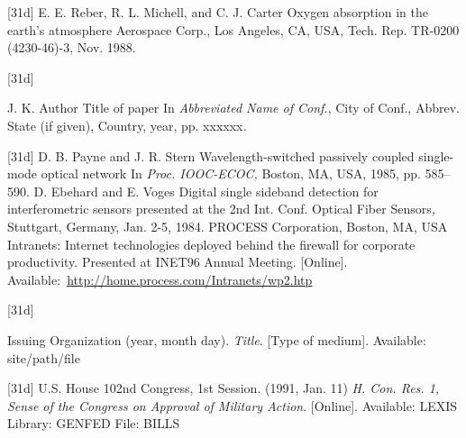 \documentclass{IEEEtaes}
\begin{document}
\vspace*{-12pt}
\begin{thebibliography}{[31d]}
\setcounter{enumiv}{12}
E. E. Reber, R. L. Michell, and C. J. Carter
\newblock Oxygen absorption in the earth's atmosphere
\newblock Aerospace Corp., Los Angeles, CA, USA, Tech. Rep. TR-0200 (4230-46)-3, Nov. 1988.
\end{thebibliography}

\vspace*{-12pt}
\begin{thebibliography}{[31d]}
\item[] J. K. Author
\newblock Title of paper
\newblock In \emph{Abbreviated Name of Conf.}, City of Conf., Abbrev. State (if given), Country, year, pp. xxxxxx\emph{.}
\end{thebibliography}

\vspace*{-12pt}
\begin{thebibliography}{[31d]}
\setcounter{enumiv}{13}
D. B. Payne and J. R. Stern
\newblock Wavelength-switched passively coupled single-mode optical network
\newblock In \emph{Proc. IOOC-ECOC,} Boston, MA, USA, 1985, pp. 585--590.
D. Ebehard and E. Voges
\newblock Digital single sideband detection for interferometric sensors
\newblock presented at the 2nd Int. Conf. Optical Fiber Sensors\emph{,} Stuttgart, Germany, Jan. 2-5, 1984.
PROCESS Corporation, Boston, MA, USA
\newblock Intranets: Internet technologies deployed behind the firewall for corporate productivity. Presented at INET96 Annual Meeting. {[}Online{]}. Available:~\href{http://home.process.com/Intranets/wp2.htp}{\url{http://home.process.com/Intranets/wp2.htp}}
\end{thebibliography}

\vspace*{-12pt}
\begin{thebibliography}{[31d]}
\item[] Issuing Organization
\newblock (year, month day). \emph{Title}. {[}Type of medium{]}. Available: site/path/file
\end{thebibliography}

\vspace*{-12pt}
\begin{thebibliography}{[31d]}
\setcounter{enumiv}{16}
U.S. House
\newblock 102nd Congress, 1st Session. (1991, Jan. 11)
\newblock\emph{H. Con. Res. 1, Sense of the Congress on Approval of Military Action}. {[}Online{]}. Available: LEXIS Library: GENFED File: BILLS
\end{thebibliography}
\end{document}
